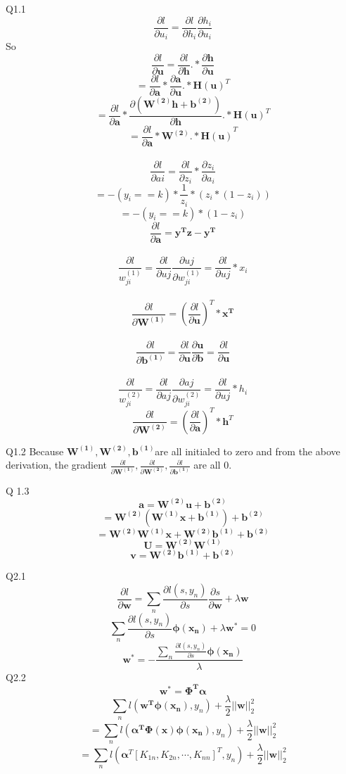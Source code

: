 \documentclass[11pt]{article}
\begin{document}
	Q1.1
	$$\frac{\partial{l}}{\partial{u_i}}=\frac{\partial{l}}{\partial{h_i}}\frac{\partial{h_i}}{\partial{u_i}}$$
	So$$ \frac{\partial{l}}{\partial{\bm{u}}}=\frac{\partial{l}}{\partial{\bm{h}}}.*\frac{\partial{\bm{h}}}{\partial{\bm{u}}}$$
		$$=\frac{\partial{l}}{\partial{\bm{a}}}*\frac{\partial{\bm{a}}}{\partial{\bm{u}}}.*\bm{H(u)}^T$$
		$$=\frac{\partial{l}}{\partial{\bm{a}}}*\frac{\partial({\bm{W^{(2)}h+b^{(2)}}})}{\partial{\bm{h}}}.*\bm{H(u)}^T$$
		$$=\frac{\partial{l}}{\partial{\bm{a}}}*\bm{W^{(2)}.*H(u)}^T$$\\

	$$\frac{\partial{l}}{\partial{ai}}=\frac{\partial{l}}{\partial{z_i}}*\frac{\partial{z_i}}{\partial{a_i}}$$
	$$=-(y_i==k)*\frac{1}{z_i}*(z_i*(1-z_i))$$
	$$=-(y_i==k)*(1-z_i)$$
	$$\frac{\partial{l}}{\partial{\bm{a}}}=\bm{y^Tz-y^T}$$\\
	

	$$\frac{\partial{l}}{w_{ji}^{(1)}}=\frac{\partial{l}}{\partial{uj}}\frac{\partial{uj}}{\partial{w_{ji}^{(1)}}}=\frac{\partial{l}}{\partial{uj}}*x_i$$\\
	$$\frac{\partial{l}}{\partial{\bm{W^{(1)}}}}=(\frac{\partial{l}}{\partial{\bm{u}}})^T*\bm{x^T}$$\\
	$$\frac{\partial{l}}{\partial{\bm{b^{(1)}}}}=\frac{\partial{l}}{\partial{\bm{u}}}\frac{\partial{\bm{u}}}{\partial{\bm{b}}}=\frac{\partial{l}}{\partial{\bm{u}}}$$\\
	$$\frac{\partial{l}}{w_{ji}^{(2)}}=\frac{\partial{l}}{\partial{aj}}\frac{\partial{aj}}{\partial{w_{ji}^{(2)}}}=\frac{\partial{l}}{\partial{uj}}*h_i$$
	$$\frac{\partial{l}}{\partial{\bm{W^{(2)}}}}=(\frac{\partial{l}}{\partial{\bm{a}}})^T*\bm{h}^T$$

	Q1.2
			Because $\bm{W^{(1)},W^{(2)},b^{(1)}}$are all initialed to zero and from the above derivation, the gradient $\frac{\partial{l}}{\partial{\bm{W^{(1)}}}},\frac{\partial{l}}{\partial{\bm{W^{(2)}}}},\frac{\partial{l}}{\partial{\bm{b^{(1)}}}}$ are all 0.

	Q 1.3 
			$$\bm{a=W^{(2)}u+b^{(2)}}$$
			$$\bm{=W^{(2)}(W^{(1)}x+b^{(1)})+b^{(2)}}$$
			$$\bm{=W^{(2)}W^{(1)}x+W^{(2)}b^{(1)}+b^{(2)}}$$
			$$\bm{U=W^{(2)}W^{(1)}}$$
			$$\bm{v=W^{(2)}b^{(1)}+b^{(2)}}$$

	Q2.1
		$$\frac{\partial{l}}{\partial{\bm{w}}}=\sum_{n}{\frac{\partial{l(s,y_n)}}{\partial{s}}\frac{\partial{s}}{\partial{\bm{w}}}}+\lambda \bm{w}$$
		$$\sum_{n}{\frac{\partial{l(s,y_n)}}{\partial{s}}}\bm{\phi(x_n)}+\lambda \bm{w^*}=0$$
		$$\bm{w^*}=-\frac{\sum_{n}{\frac{\partial{l(s,y_n)}}{\partial{s}}}\bm{\phi(x_n)}}{\lambda}$$
	Q2.2
		$$\bm{w^*}=\bm{\Phi^T\alpha}$$
		$$ \sum_{n}l(\bm{w^T{\phi(x_n)}},y_n)+\frac{\lambda}{2}||\bm{w}||_2^2$$
		$$=\sum_{n}l(\bm{\alpha^T\Phi(x)\phi(x_n)},y_n)+\frac{\lambda}{2}||\bm{w}||_2^2$$
		$$ =\sum_{n}l(\bm{\alpha}^T[K_{1n},K_{2n},\cdots,K_{nn}]^T,y_n)+\frac{\lambda}{2}||\bm{w}||_2^2$$
\end{document}
